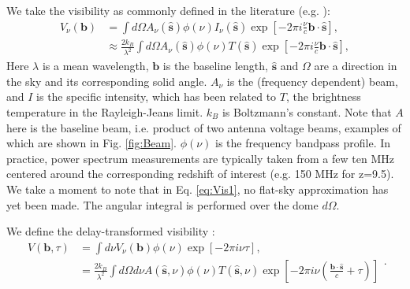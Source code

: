 \documentclass[twocolumn,apj,numberedappendix]{emulateapj}
\renewcommand\[{\begin{equation}}
\renewcommand\]{\end{equation}}
\begin{document}
We take the visibility as commonly defined in the literature (e.g.
\citealt{first-paper}): 
\begin{equation}
\begin{aligned}V_{\nu}(\boldsymbol{b}) & =\int d\Omega A_{\nu}(\hat{\boldsymbol{s}})\phi(\nu)I_{\nu}(\hat{\boldsymbol{s}})\exp\left[-2\pi i\frac{\nu}{c}\boldsymbol{b}\cdot\hat{\boldsymbol{s}}\right],\\
 & \approx\frac{2k_{B}}{\lambda^{2}}\int d\Omega A_{\nu}(\hat{\boldsymbol{s}})\phi(\nu)T(\hat{\boldsymbol{s}})\exp\left[-2\pi i\frac{\nu}{c}\boldsymbol{b}\cdot\hat{\boldsymbol{s}}\right],
\end{aligned}
\label{eq:Vis1}
\end{equation}
Here $\lambda$ is a mean wavelength, $\boldsymbol{b}$ is the baseline
length, $\hat{\boldsymbol{s}}$ and $\Omega$ are a direction in the
sky and its corresponding solid angle. $A_{\nu}$ is the (frequency
dependent) beam, and $I$ is the specific intensity, which has been
related to $T$, the brightness temperature in the Rayleigh-Jeans
limit. $k_B$ is Boltzmann's constant. Note that $A$ here is the baseline beam, i.e. product of two antenna voltage beams, examples of which are shown in Fig. \ref{fig:Beam}. $\phi(\nu)$ is the frequency bandpass profile. In practice,
power spectrum measurements are typically taken from a few ten MHz centered around the corresponding redshift of interest (e.g. 150 MHz for z=9.5). We take a moment to note that in Eq. \ref{eq:Vis1}, no flat-sky approximation has yet been made. The angular integral is performed over the dome $d\Omega$. 

We define the delay-transformed visibility \citep{delay-transform}:
\small
\begin{equation}
\begin{aligned}V(\boldsymbol{b},\tau) & =\int d\nu V_{\nu}(\boldsymbol{b})\phi(\nu)\exp\left[-2\pi i\nu\tau\right],\\
 & =\frac{2k_{B}}{\lambda^{2}}\int d\Omega d\nu A(\hat{\boldsymbol{s}},\nu)\phi(\nu)T(\hat{\boldsymbol{s}},\nu)\exp\left[-2\pi i\nu\left(\frac{\boldsymbol{b}\cdot\hat{\boldsymbol{s}}}{c}+\tau\right)\right]
\end{aligned}
.\label{eq:Vb1}
\end{equation}
\normalsize
\end{document}
